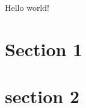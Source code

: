 \documentclass[10pt]{report}
\begin{document}
Hello world!
\section{Section 1}

\section{section 2}
\end{document}
